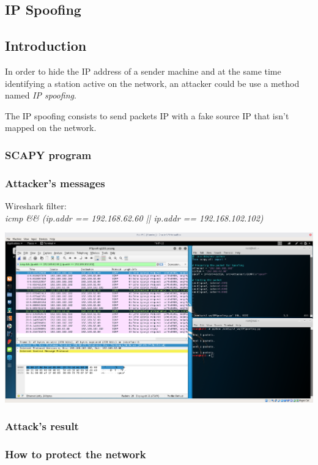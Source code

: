 \subsection{IP Spoofing}
\subsection{Introduction}
In order to hide the IP address of a sender machine and at the same time identifying a station active on the network, an attacker could be use a method named \textit{IP spoofing}.\par
The IP spoofing consists to send packets IP with a fake source IP that isn't mapped on the network.

\subsubsection{SCAPY program}


\subsubsection{Attacker's messages}
Wireshark filter:\\
\textit{icmp \&\& (ip.addr == 192.168.62.60 || ip.addr == 192.168.102.102)}\par
\includegraphics[width=16cm]{img/IPSpoofing.png}

\subsubsection{Attack's result}


\subsubsection{How to protect the network}
